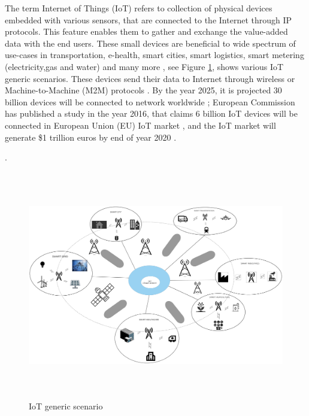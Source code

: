 \documentclass[12pt]{article}
\begin{document}
The term Internet of Things (IoT) refers to collection of physical devices embedded with various sensors, that are connected to the Internet through IP protocols. This feature enables them to gather and exchange the value-added data with the end users. These small devices are  beneficial to wide spectrum of use-cases in transportation, e-health, smart cities, smart logistics, smart metering (electricity,gas and water) and many more \cite{basu2019experimental}, see Figure \ref{fig:IoT generic scenario}, shows various IoT generic scenarios. These devices send their data to Internet through wireless or Machine-to-Machine (M2M) protocols \cite{singh2015secure}. By the year 2025, it is projected 30 billion devices will be connected to network worldwide \cite{nokiaresource}; European Commission has published a study in the year 2016, that claims 6 billion IoT devices will be connected in European Union (EU) IoT market \cite{EUIoT}, and the IoT market will generate \$1 trillion euros by end of year 2020 \cite{liu2019privacy}. \par. 
\begin{figure}[H]
  \includegraphics[width=\columnwidth,height=10cm,keepaspectratio]{Images/iot_generic_scenario.pdf}
  \centering
  \caption{IoT generic scenario}
  \label{fig:IoT generic scenario}
\end{figure}
\end{document}
